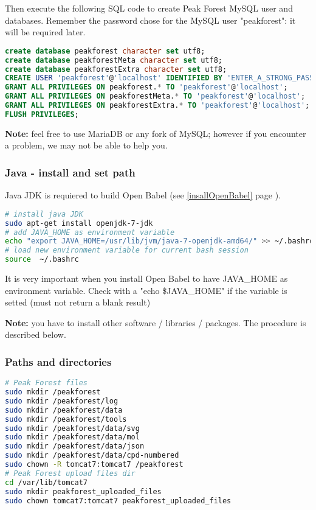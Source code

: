 Then execute the following SQL code to create Peak Forest MySQL user and databases. 
Remember the password chose for the MySQL user "peakforest": it will be required later.

\begin{lstlisting}[language=SQL,caption={create MySQL users and databases},frame=bt]
create database peakforest character set utf8;
create database peakforestMeta character set utf8;
create database peakforestExtra character set utf8;
CREATE USER 'peakforest'@'localhost' IDENTIFIED BY 'ENTER_A_STRONG_PASSOWRD';
GRANT ALL PRIVILEGES ON peakforest.* TO 'peakforest'@'localhost';
GRANT ALL PRIVILEGES ON peakforestMeta.* TO 'peakforest'@'localhost';
GRANT ALL PRIVILEGES ON peakforestExtra.* TO 'peakforest'@'localhost';
FLUSH PRIVILEGES;
\end{lstlisting}

\textbf{Note:} feel free to use MariaDB or any fork of MySQL; 
however if you encounter a problem, we may not be able to help you.

\subsubsection{Java - install and set path}

Java JDK is requiered to build Open Babel (see \ref{insallOpenBabel} page \pageref{insallOpenBabel}).

\begin{lstlisting}[language=bash,caption={Install Java and set environment variable },frame=bt]
# install java JDK 
sudo apt-get install openjdk-7-jdk
# add JAVA_HOME as environment variable
echo "export JAVA_HOME=/usr/lib/jvm/java-7-openjdk-amd64/" >> ~/.bashrc
# load new environment variable for current bash session
source  ~/.bashrc
\end{lstlisting}

It is very important when you install Open Babel to have JAVA\_HOME as environment variable. 
Check with a "echo \$JAVA\_HOME" if the variable is setted (must not return a blank result)

\textbf{Note:} you have to install other software / libraries / packages.
The procedure is described below. 

\subsubsection{Paths and directories}

\begin{lstlisting}[language=bash,caption={Paths and directories for Peak Forest},frame=bt]
# Peak Forest files
sudo mkdir /peakforest
sudo mkdir /peakforest/log
sudo mkdir /peakforest/data
sudo mkdir /peakforest/tools
sudo mkdir /peakforest/data/svg
sudo mkdir /peakforest/data/mol
sudo mkdir /peakforest/data/json
sudo mkdir /peakforest/data/cpd-numbered
sudo chown -R tomcat7:tomcat7 /peakforest
# Peak Forest upload files dir
cd /var/lib/tomcat7
sudo mkdir peakforest_uploaded_files
sudo chown tomcat7:tomcat7 peakforest_uploaded_files
\end{lstlisting}


